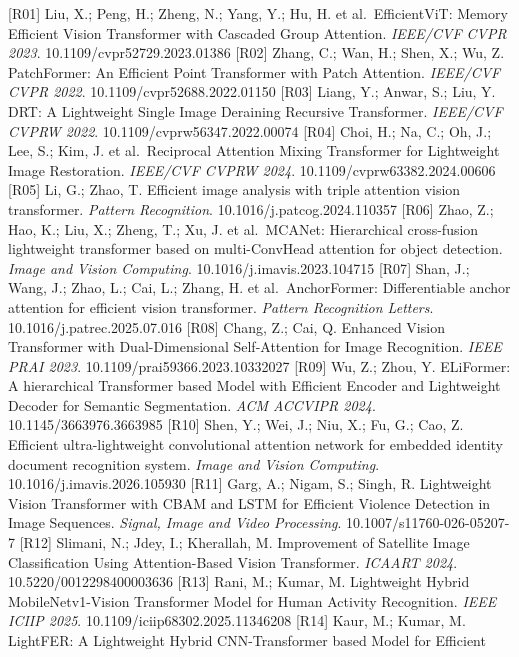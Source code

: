 \documentclass[
  chinese,
]{article}
\begin{document}
{[}R01{]} Liu, X.; Peng, H.; Zheng, N.; Yang, Y.; Hu, H. et
al.~EfficientViT: Memory Efficient Vision Transformer with Cascaded
Group Attention. \emph{IEEE/CVF CVPR 2023}. 10.1109/cvpr52729.2023.01386
{[}R02{]} Zhang, C.; Wan, H.; Shen, X.; Wu, Z. PatchFormer: An Efficient
Point Transformer with Patch Attention. \emph{IEEE/CVF CVPR 2022}.
10.1109/cvpr52688.2022.01150 {[}R03{]} Liang, Y.; Anwar, S.; Liu, Y.
DRT: A Lightweight Single Image Deraining Recursive Transformer.
\emph{IEEE/CVF CVPRW 2022}. 10.1109/cvprw56347.2022.00074 {[}R04{]}
Choi, H.; Na, C.; Oh, J.; Lee, S.; Kim, J. et al.~Reciprocal Attention
Mixing Transformer for Lightweight Image Restoration. \emph{IEEE/CVF
CVPRW 2024}. 10.1109/cvprw63382.2024.00606 {[}R05{]} Li, G.; Zhao, T.
Efficient image analysis with triple attention vision transformer.
\emph{Pattern Recognition}. 10.1016/j.patcog.2024.110357 {[}R06{]} Zhao,
Z.; Hao, K.; Liu, X.; Zheng, T.; Xu, J. et al.~MCANet: Hierarchical
cross-fusion lightweight transformer based on multi-ConvHead attention
for object detection. \emph{Image and Vision Computing}.
10.1016/j.imavis.2023.104715 {[}R07{]} Shan, J.; Wang, J.; Zhao, L.;
Cai, L.; Zhang, H. et al.~AnchorFormer: Differentiable anchor attention
for efficient vision transformer. \emph{Pattern Recognition Letters}.
10.1016/j.patrec.2025.07.016 {[}R08{]} Chang, Z.; Cai, Q. Enhanced
Vision Transformer with Dual-Dimensional Self-Attention for Image
Recognition. \emph{IEEE PRAI 2023}. 10.1109/prai59366.2023.10332027
{[}R09{]} Wu, Z.; Zhou, Y. ELiFormer: A hierarchical Transformer based
Model with Efficient Encoder and Lightweight Decoder for Semantic
Segmentation. \emph{ACM ACCVIPR 2024}. 10.1145/3663976.3663985 {[}R10{]}
Shen, Y.; Wei, J.; Niu, X.; Fu, G.; Cao, Z. Efficient ultra-lightweight
convolutional attention network for embedded identity document
recognition system. \emph{Image and Vision Computing}.
10.1016/j.imavis.2026.105930 {[}R11{]} Garg, A.; Nigam, S.; Singh, R.
Lightweight Vision Transformer with CBAM and LSTM for Efficient Violence
Detection in Image Sequences. \emph{Signal, Image and Video Processing}.
10.1007/s11760-026-05207-7 {[}R12{]} Slimani, N.; Jdey, I.; Kherallah,
M. Improvement of Satellite Image Classification Using Attention-Based
Vision Transformer. \emph{ICAART 2024}. 10.5220/0012298400003636
{[}R13{]} Rani, M.; Kumar, M. Lightweight Hybrid MobileNetv1-Vision
Transformer Model for Human Activity Recognition. \emph{IEEE ICIIP
2025}. 10.1109/iciip68302.2025.11346208 {[}R14{]} Kaur, M.; Kumar, M.
LightFER: A Lightweight Hybrid CNN-Transformer based Model for Efficient
\end{document}
